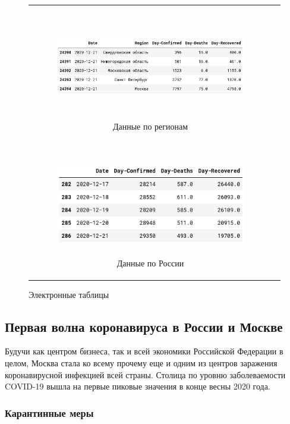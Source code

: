 \documentclass[a4paper, 12pt]{extarticle}
\begin{document}
\begin{figure}[h]
    \centering
    \begin{tabular}[c]{cc}
    \begin{subfigure}[b]{\textwidth} \centering
        \includegraphics[height=130pt]{../plots/regions_df2.png}
        \caption{Данные по регионам} \label{fig:regions_df2}
    \end{subfigure}& \\

    \begin{subfigure}[b]{\textwidth} \centering
        \includegraphics[height=130pt]{../plots/country_df2.png}
        \caption{Данные по России} \label{fig:country_df2}
    \end{subfigure}
    \end{tabular}
    \caption{Электронные таблицы} \label{fig:collection2_res}
\end{figure}

\clearpage
\newpage

\subsection{Первая волна коронавируса в России и Москве}
Будучи как центром бизнеса, так и всей экономики Российской Федерации в целом, Москва
стала ко всему прочему еще и одним из центров заражения коронавирусной
инфекцией всей страны. Столица по уровню заболеваемости COVID-19 вышла на первые пиковые
значения в конце весны 2020 года.

\subsubsection{Карантинные меры}
\end{document}
